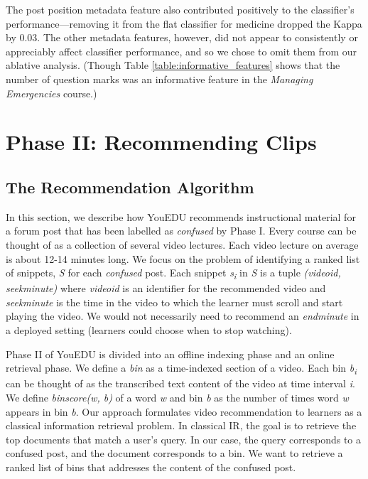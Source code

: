 \documentclass{edm_template}
\begin{document}
The post position metadata feature also contributed positively to the classifier's performance---removing it from the flat classifier for medicine dropped the Kappa by 0.03. The other metadata features, however, did not appear to consistently or appreciably affect classifier performance, and so we chose to omit them from our ablative analysis. (Though Table \ref{table:informative_features} shows that the number of question marks was  an informative feature in the \emph{Managing Emergencies} course.)

\section{Phase II: Recommending Clips}
\label{sec:clipRecommendation}
\vspace{1mm}
\subsection{The Recommendation Algorithm}
\vspace{1mm}
In this section, we describe how YouEDU recommends instructional material for a forum post that
has been labelled as \textit{confused} by Phase I. Every course can be thought of as a collection of several video lectures. Each video lecture on average is about 12-14 minutes long. We focus on the problem of identifying a ranked list of snippets, \textit{S} for each \textit{confused} post. Each snippet \textit{s\textsubscript i} in \textit{S} is a tuple \textit{(video\textunderscore id, seek\textunderscore minute)} where \textit{video\textunderscore id} is an identifier for the recommended video and \textit{seek\textunderscore minute} is the time in the video to which the learner must scroll and start playing the video. We would not necessarily need to recommend an \textit{end\textunderscore minute} in a deployed setting (learners could choose when to stop watching).

Phase II of YouEDU is divided into an offline indexing phase and an online retrieval phase.
We define a \textit {bin} as a time-indexed section of a video. Each bin \textit{b\textsubscript{i}} can be thought of as the transcribed text content of the video
at time interval \textit{i}. We define \textit{binscore(w, b)} of a word \textit{w} and bin \textit{b} as the number of times word \textit{w} appears in bin \textit{b}. Our approach formulates video recommendation to learners as a classical information retrieval problem. In classical IR, the goal is to retrieve the top documents that match a user's query. In our case, the query corresponds to a confused post, and the document corresponds to a bin. We want to retrieve a ranked list of bins that addresses the content of the confused post.
\vspace{-0.3cm}
\end{document}
